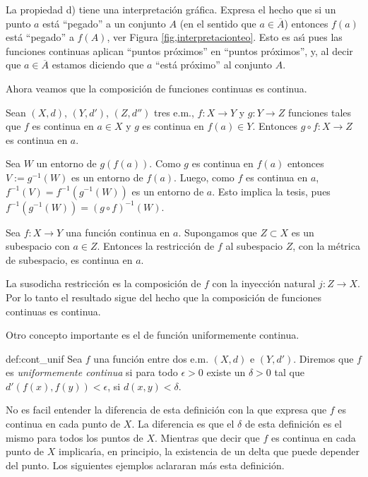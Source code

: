 La propiedad d) tiene una interpretación gráfica. Expresa el
hecho que si un punto $a$ está ``pegado'' a un conjunto $A$ (en
el sentido que $a\in \overline{A}$) entonces $f(a)$ está
``pegado'' a $f(A)$, ver Figura \ref{fig,interpretacionteo}. Esto
es as\'{\i} pues las funciones continuas aplican ``puntos
próximos'' en ``puntos próximos'', y, al decir que
$a\in\overline{A}$ estamos diciendo que $a$ ``está próximo''
al conjunto $A$.



Ahora veamos que la composición de funciones continuas es
continua.

\begin{proposicion}{} Sean $(X,d)$, $(Y,d')$, $(Z,d'')$ tres e.m.,
$f:X\rightarrow Y$ y $g:Y\rightarrow Z$ funciones tales que $f$ es
continua en $a\in X$ y $g$ es continua en $f(a)\in Y$. Entonces
$g\circ f:X\rightarrow Z$ es continua en $a$.
\end{proposicion}
\begin{demo} Sea $W$ un entorno de $g(f(a))$. Como $g$ es continua
en $f(a)$ entonces $V:=g^{-1}(W)$ es un entorno de $f(a)$. Luego,
como $f$ es continua en $a$, $f^{-1}(V)=f^{-1}(g^{-1}(W))$ es un
entorno de $a$. Esto implica la tesis, pues
$f^{-1}(g^{-1}(W))=(g\circ f)^{-1}(W)$.
\end{demo}

\begin{corolario}{} Sea $f:X\rightarrow Y$ una función continua
en $a$. Supongamos que $Z\subset X$ es un subespacio con $a\in Z$.
Entonces la restricción de $f$ al subespacio $Z$, con la
métrica de subespacio, es continua en $a$.
\end{corolario}
\begin{demo} La susodicha restricción es la composición de $f$
con la inyección natural $j:Z\rightarrow X$. Por lo tanto el
resultado sigue del hecho que la composición de funciones
continuas es continua.
\end{demo}

Otro concepto importante es el de función uniformemente
continua.

\begin{definicion}{def:cont_unif} Sea $f$ una función entre dos e.m. $(X,d)$ e $(Y,d')$.
Diremos que $f$ es \emph{uniformemente continua} si para todo
$\epsilon>0$ existe un $\delta>0$ tal que
$d'(f(x),f(y))<\epsilon$, si $d(x,y)<\delta$.
\end{definicion}

No es facil entender la diferencia de esta definición con la que
expresa que $f$ es continua en cada punto de $X$. La diferencia es
que el $\delta$ de esta definición es el mismo para todos los
puntos de $X$. Mientras que decir que $f$ es continua en cada
punto de $X$ implicar\'{\i}a, en principio, la existencia de un
delta  que puede depender del punto. Los siguientes ejemplos
aclararan más esta definición.


